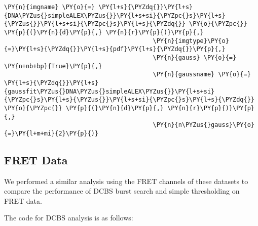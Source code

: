 \begin{Verbatim}[commandchars=\\\{\}, fontsize=\scriptsize]
                                         \PY{n}{imgname} \PY{o}{=} \PY{l+s}{\PYZdq{}}\PY{l+s}{DNA\PYZus{}simpleALEX\PYZus{}}\PY{l+s+si}{\PYZpc{}s}\PY{l+s}{\PYZus{}}\PY{l+s+si}{\PYZpc{}s}\PY{l+s}{\PYZdq{}} \PY{o}{\PYZpc{}} \PY{p}{(}\PY{n}{d}\PY{p}{,} \PY{n}{r}\PY{p}{)}\PY{p}{,} 
                                         \PY{n}{imgtype}\PY{o}{=}\PY{l+s}{\PYZdq{}}\PY{l+s}{pdf}\PY{l+s}{\PYZdq{}}\PY{p}{,} 
                                         \PY{n}{gauss} \PY{o}{=} \PY{n+nb+bp}{True}\PY{p}{,} 
                                         \PY{n}{gaussname} \PY{o}{=} \PY{l+s}{\PYZdq{}}\PY{l+s}{gaussfit\PYZus{}DNA\PYZus{}simpleALEX\PYZus{}}\PY{l+s+si}{\PYZpc{}s}\PY{l+s}{\PYZus{}}\PY{l+s+si}{\PYZpc{}s}\PY{l+s}{\PYZdq{}} \PY{o}{\PYZpc{}} \PY{p}{(}\PY{n}{d}\PY{p}{,} \PY{n}{r}\PY{p}{)}\PY{p}{,} 
                                         \PY{n}{n\PYZus{}gauss}\PY{o}{=}\PY{l+m+mi}{2}\PY{p}{)}
\end{Verbatim}

\subsection{FRET Data}
\label{app:code_samples_FRET_mix}
We performed a similar analysis using the FRET channels of these datasets to compare the performance of DCBS burst search and simple thresholding on FRET data.

The code for DCBS analysis is as follows:

